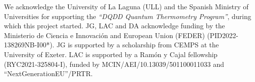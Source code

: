 \documentclass[aps,pra,superscriptaddress,twocolumn,nofootinbib]{revtex4-2}
\renewcommand*{\thefootnote}{\fnsymbol{footnote}}
\begin{document}
\acknowledgements

We acknowledge the University of La Laguna (ULL) and the Spanish Ministry of Universities for supporting the \textit{``DQDD Quantum Thermometry Program''}, during which this project started. JG, LAC and DA acknowledge funding by the Ministerio de Ciencia e Innovación and European Union (FEDER) (PID2022-138269NB-I00*). JG is supported by a scholarship from CEMPS at the University of Exeter. LAC is supported by a Ram\'{o}n y Cajal fellowship (RYC2021-325804-I), funded by MCIN/AEI/10.13039/501100011033 and “NextGenerationEU”/PRTR. 

\renewcommand{\thefootnote}{\fnsymbol{footnote}}



\end{document}
